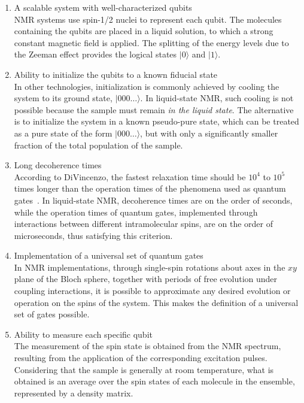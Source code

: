 \begin{enumerate}
\item A scalable system with well-characterized qubits\\
NMR systems use spin-1/2 nuclei to represent each qubit. The molecules containing the qubits are placed in a liquid solution, to which a strong constant magnetic field is applied. The splitting of the energy levels due to the Zeeman effect provides the logical states $\lvert 0 \rangle$ and $\lvert 1 \rangle$.

\item Ability to initialize the qubits to a known fiducial state\\
In other technologies, initialization is commonly achieved by cooling the system to its ground state, $\lvert 000\dots \rangle$. In liquid-state NMR, such cooling is not possible because the sample must remain \emph{in the liquid state}. The alternative is to initialize the system in a known pseudo-pure state, which can be treated as a pure state of the form $\lvert 000\dots \rangle$, but with only a significantly smaller fraction of the total population of the sample.

\item Long decoherence times\\
According to DiVincenzo, the fastest relaxation time should be $10^4$ to $10^5$ times longer than the operation times of the phenomena used as quantum gates~\cite{DiVincenzo_2000}. In liquid-state NMR, decoherence times are on the order of seconds, while the operation times of quantum gates, implemented through interactions between different intramolecular spins, are on the order of microseconds, thus satisfying this criterion.

\item Implementation of a universal set of quantum gates\\
In NMR implementations, through single-spin rotations about axes in the $xy$ plane of the Bloch sphere, together with periods of free evolution under coupling interactions, it is possible to approximate any desired evolution or operation on the spins of the system. This makes the definition of a universal set of gates possible.

\item Ability to measure each specific qubit\\
The measurement of the spin state is obtained from the NMR spectrum, resulting from the application of the corresponding excitation pulses. Considering that the sample is generally at room temperature, what is obtained is an average over the spin states of each molecule in the ensemble, represented by a density matrix.

\end{enumerate}

